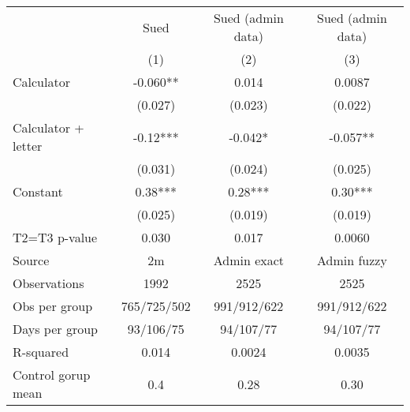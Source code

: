 \centering
    \begin{tabular}{lccc}
          &       &       &  \\
    \midrule
    \midrule
          & Sued  & Sued (admin data) & Sued (admin data) \\
    \midrule
          & (1)   & (2)   & (3) \\
    \midrule
    Calculator & -0.060** & 0.014 & 0.0087 \\
          & (0.027) & (0.023) & (0.022) \\
    Calculator + letter & -0.12*** & -0.042* & -0.057** \\
          & (0.031) & (0.024) & (0.025) \\
    Constant & 0.38*** & 0.28*** & 0.30*** \\
          & (0.025) & (0.019) & (0.019) \\
    T2=T3 p-value & 0.030 & 0.017 & 0.0060 \\
    Source & 2m    & Admin exact & Admin fuzzy \\
    Observations & 1992  & 2525  & 2525 \\
    Obs per group & 765/725/502 & 991/912/622 & 991/912/622 \\
    Days per group & 93/106/75 & 94/107/77 & 94/107/77 \\
    R-squared & 0.014 & 0.0024 & 0.0035 \\
    Control gorup mean & 0.4   & 0.28  & 0.30 \\
    \bottomrule
    \bottomrule
    \end{tabular}%
 